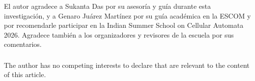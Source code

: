 \begin{credits}
\subsubsection{\ackname}
El autor agradece a Sukanta Das por su asesoría y guía durante esta investigación, y a Genaro Juárez Martínez por su guía académica en la ESCOM y por recomendarle participar en la Indian Summer School on Cellular Automata 2026. Agradece también a los organizadores y revisores de la escuela por sus comentarios.

\subsubsection{\discintname}
The author has no competing interests to declare that are relevant to
the content of this article.
\end{credits}
